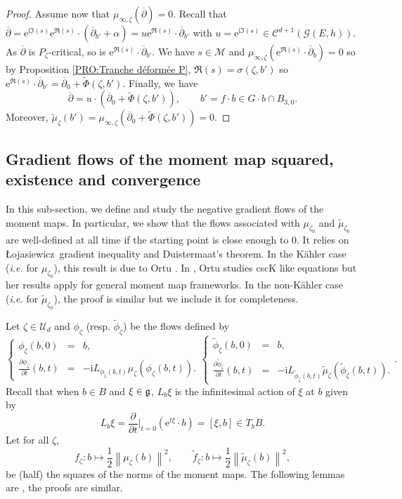 \documentclass{article}
\theoremstyle{remark}
\theoremstyle{definition}
\renewcommand{\i}{\boldsymbol{\mathrm{i}}}
\newcommand{\e}{\boldsymbol{\mathrm{e}}}
\newcommand{\norme}[1]{\left\| #1 \right\|}
\newcommand{\G}{\mathcal{G}}
\newcommand{\mC}{\mathcal{C}}
\newcommand{\mU}{\mathcal{U}}
\newcommand{\dbar}{\overline{\partial}}
\newcommand{\Lo}{Łojasiewicz}
\begin{document}
\begin{proof}
Assume now that $\mu_{\infty,\zeta}(\dbar) = 0$. Recall that $\dbar = \e^{\i\Im(s)}\e^{\Re(s)} \cdot (\dbar_{b'} + \alpha) = u\e^{\Re(s)} \cdot \dbar_{b'}$ with $u = \e^{\i\Im(s)} \in \mC^{d + 1}(\G(E,h))$. As $\dbar$ is $P_\zeta$-critical, so is $\e^{\Re(s)} \cdot \dbar_{b'}$. We have $s \in \mathcal{M}$ and $\mu_{\infty,\zeta}(\e^{\Re(s)} \cdot \dbar_b) = 0$ so by Proposition \ref{PRO:Tranche déformée P}, $\Re(s) = \sigma(\zeta,b')$ so $\e^{\Re(s)} \cdot \dbar_{b'} = \dbar_0 + \tilde{\Phi}(\zeta,b')$. Finally, we have
$$
\dbar = u \cdot (\dbar_0 + \tilde{\Phi}(\zeta,b')), \qquad b' = f \cdot b \in G \cdot b \cap B_{3,0}.
$$
Moreover, $\tilde{\mu}_\zeta(b') = \mu_{\infty,\zeta}(\dbar_0 + \tilde{\Phi}(\zeta,b')) = 0$.
\end{proof}

\subsection{Gradient flows of the moment map squared, existence and convergence}

In this sub-section, we define and study the negative gradient flows of the moment maps. In particular, we show that the flows associated with $\mu_{\zeta_0}$ and $\tilde{\mu}_{\zeta_0}$ are well-defined at all time if the starting point is close enough to $0$. It relies on \Lo\ gradient inequality and Duistermaat's theorem. In the Kähler case (\textit{i.e.} for $\mu_{\zeta_0}$), this result is due to Ortu \cite[Proposition 2.4]{Ortu}. In \cite{Ortu}, Ortu studies cscK like equations but her results \cite[Sub-section 2.1]{Ortu} apply for general moment map frameworks. In the non-Kähler case (\textit{i.e.} for $\tilde{\mu}_{\zeta_0}$), the proof is similar but we include it for completeness.

Let $\zeta \in \mU_d$ and $\phi_\zeta$ (resp. $\tilde{\phi}_\zeta$) be the flows defined by
$$
\left\{
\begin{array}{rcl}
    \phi_\zeta(b,0) & = & b,\\
    \frac{\partial\phi_\zeta}{\partial t}(b,t) & = & -\i L_{\phi_\zeta(b,t)}\mu_\zeta(\phi_\zeta(b,t)).
\end{array}
\right.
\left\{
\begin{array}{rcl}
    \tilde{\phi}_\zeta(b,0) & = & b,\\
    \frac{\partial\tilde{\phi}_\zeta}{\partial t}(b,t) & = & -\i L_{\tilde{\phi}_\zeta(b,t)}\tilde{\mu}_\zeta(\tilde{\phi}_\zeta(b,t)).
\end{array}
\right..
$$
Recall that when $b \in B$ and $\xi \in \frak{g}$, $L_b\xi$ is the infinitesimal action of $\xi$ at $b$ given by
$$
L_b\xi = \frac{\partial}{\partial t}|_{t = 0}(\e^{t\xi} \cdot b) = [\xi,b] \in T_bB.
$$
Let for all $\zeta$,
$$
f_\zeta : b \mapsto \frac{1}{2}\norme{\mu_\zeta(b)}^2, \qquad \tilde{f}_\zeta : b \mapsto \frac{1}{2}\norme{\tilde{\mu}_\zeta(b)}^2,
$$
be (half) the squares of the norms of the moment maps. The following lemmas are \cite[Lemma 3.1, Lemma 3.2]{GRS}, the proofs are similar.
\end{document}
